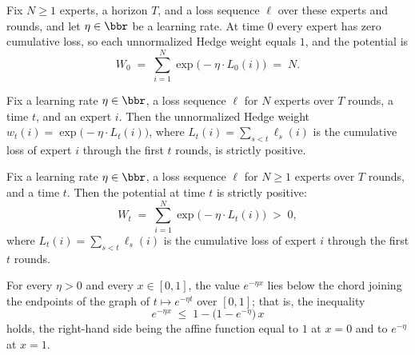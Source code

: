 \begin{lemma}
\label{potential_zero}
\leanok
{}
Fix $N \ge 1$ experts, a horizon $T$, and a loss sequence $\ell$ over these experts and
rounds, and let $\eta \in \bbr$ be a learning rate. At time $0$ every expert has zero
cumulative loss, so each unnormalized Hedge weight equals $1$, and the potential is
\[
  W_0 \;=\; \sum_{i=1}^{N} \exp\!\bigl(-\eta \cdot L_0(i)\bigr) \;=\; N .
\]
\end{lemma}

\begin{lemma}
\label{hedgeWeight_pos}
\leanok
{}
Fix a learning rate $\eta \in \bbr$, a loss sequence $\ell$ for $N$ experts over $T$
rounds, a time $t$, and an expert $i$. Then the unnormalized Hedge weight $w_t(i) =
\exp\!\bigl(-\eta \cdot L_t(i)\bigr)$, where $L_t(i) = \sum_{s < t} \ell_s(i)$ is the
cumulative loss of expert $i$ through the first $t$ rounds, is strictly positive.
\end{lemma}

\begin{lemma}
\label{potential_pos}
\leanok
{}
Fix a learning rate $\eta \in \bbr$, a loss sequence $\ell$ for $N \ge 1$ experts over
$T$ rounds, and a time $t$. Then the potential at time $t$ is strictly positive:
\[
  W_t \;=\; \sum_{i=1}^{N} \exp\!\bigl(-\eta \cdot L_t(i)\bigr) \;>\; 0,
\]
where $L_t(i) = \sum_{s < t} \ell_s(i)$ is the cumulative loss of expert $i$ through the
first $t$ rounds.
\end{lemma}

\begin{lemma}
\label{exp_neg_le_linear}
\leanok
{}
For every $\eta > 0$ and every $x \in [0,1]$, the value $e^{-\eta x}$ lies below the
chord joining the endpoints of the graph of $t \mapsto e^{-\eta t}$ over $[0,1]$; that
is, the inequality
\[
  e^{-\eta x} \;\le\; 1 - \bigl(1 - e^{-\eta}\bigr)\,x
\]
holds, the right-hand side being the affine function equal to $1$ at $x = 0$ and to
$e^{-\eta}$ at $x = 1$.
\end{lemma}

